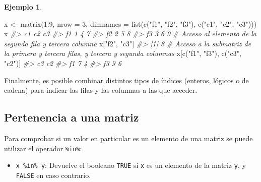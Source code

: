 \documentclass[
]{book}
\newenvironment{Shaded}{\begin{snugshade}}{\end{snugshade}}
\newcommand{\AttributeTok}[1]{\textcolor[rgb]{0.77,0.63,0.00}{#1}}
\newcommand{\CommentTok}[1]{\textcolor[rgb]{0.56,0.35,0.01}{\textit{#1}}}
\newcommand{\DecValTok}[1]{\textcolor[rgb]{0.00,0.00,0.81}{#1}}
\newcommand{\FunctionTok}[1]{\textcolor[rgb]{0.00,0.00,0.00}{#1}}
\newcommand{\NormalTok}[1]{#1}
\newcommand{\OtherTok}[1]{\textcolor[rgb]{0.56,0.35,0.01}{#1}}
\newcommand{\SpecialCharTok}[1]{\textcolor[rgb]{0.00,0.00,0.00}{#1}}
\newcommand{\StringTok}[1]{\textcolor[rgb]{0.31,0.60,0.02}{#1}}
\providecommand{\tightlist}{%
  \setlength{\itemsep}{0pt}\setlength{\parskip}{0pt}}
\theoremstyle{definition}
\theoremstyle{definition}
\newtheorem{example}{Ejemplo}[chapter]
\theoremstyle{definition}
\theoremstyle{definition}
\theoremstyle{remark}
\begin{document}
\begin{example}
\begin{Shaded}
\begin{Highlighting}[]
\NormalTok{x }\OtherTok{\textless{}{-}} \FunctionTok{matrix}\NormalTok{(}\DecValTok{1}\SpecialCharTok{:}\DecValTok{9}\NormalTok{, }\AttributeTok{nrow =} \DecValTok{3}\NormalTok{, }\AttributeTok{dimnames =} \FunctionTok{list}\NormalTok{(}\FunctionTok{c}\NormalTok{(}\StringTok{"f1"}\NormalTok{, }\StringTok{"f2"}\NormalTok{, }\StringTok{"f3"}\NormalTok{), }\FunctionTok{c}\NormalTok{(}\StringTok{"c1"}\NormalTok{, }\StringTok{"c2"}\NormalTok{, }\StringTok{"c3"}\NormalTok{)))}
\NormalTok{x}
\CommentTok{\#\textgreater{}    c1 c2 c3}
\CommentTok{\#\textgreater{} f1  1  4  7}
\CommentTok{\#\textgreater{} f2  2  5  8}
\CommentTok{\#\textgreater{} f3  3  6  9}
\CommentTok{\# Acceso al elemento de la segunda fila y tercera columna}
\NormalTok{x[}\StringTok{"f2"}\NormalTok{, }\StringTok{"c3"}\NormalTok{]}
\CommentTok{\#\textgreater{} [1] 8}
\CommentTok{\# Acceso a la submatriz de la primera y tercera filas, y tercera y segunda columnas}
\NormalTok{x[}\FunctionTok{c}\NormalTok{(}\StringTok{"f1"}\NormalTok{, }\StringTok{"f3"}\NormalTok{), }\FunctionTok{c}\NormalTok{(}\StringTok{"c3"}\NormalTok{, }\StringTok{"c2"}\NormalTok{)]}
\CommentTok{\#\textgreater{}    c3 c2}
\CommentTok{\#\textgreater{} f1  7  4}
\CommentTok{\#\textgreater{} f3  9  6}
\end{Highlighting}
\end{Shaded}

\end{example}

Finalmente, es posible combinar distintos tipos de índices (enteros, lógicos o de cadena) para indicar las filas y las columnas a las que acceder.

\hypertarget{pertenencia-a-una-matriz}{%
\subsection{Pertenencia a una matriz}\label{pertenencia-a-una-matriz}}

Para comprobar si un valor en particular es un elemento de una matriz se puede utilizar el operador \texttt{\%in\%}:

\begin{itemize}
\tightlist
\item
  \texttt{x\ \%in\%\ y}: Devuelve el booleano \texttt{TRUE} si \texttt{x} es un elemento de la matriz \texttt{y}, y \texttt{FALSE} en caso contrario.
\end{itemize}
\end{document}
